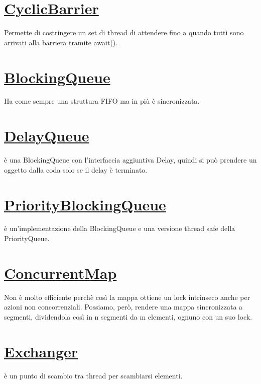 \documentclass[11pt,a4paper]{book}
\begin{document}
\section{\href{https://docs.oracle.com/javase/7/docs/api/java/util/concurrent/CyclicBarrier.html}{CyclicBarrier}}
Permette di costringere un set di thread di attendere fino a quando tutti sono arrivati alla barriera tramite await().
\section{\href{https://docs.oracle.com/javase/7/docs/api/java/util/concurrent/BlockingQueue.html}{BlockingQueue}}
Ha come sempre una struttura FIFO ma in più è sincronizzata.
\section{\href{https://docs.oracle.com/javase/7/docs/api/java/util/concurrent/DelayQueue.html}{DelayQueue}}
è una BlockingQueue con l'interfaccia aggiuntiva Delay, quindi si può prendere un oggetto dalla coda solo se il delay è terminato.
\section{\href{https://docs.oracle.com/javase/7/docs/api/java/util/concurrent/PriorityBlockingQueue.html}{PriorityBlockingQueue}}
è un'implementazione della BlockingQueue e una versione thread safe della PriorityQueue. 
\section{\href{https://docs.oracle.com/javase/8/docs/api/java/util/concurrent/ConcurrentMap.html}{ConcurrentMap}}
Non è molto efficiente perchè così la mappa ottiene un lock intrinseco anche per azioni non concorrenziali. Possiamo, però, rendere una mappa sincronizzata a segmenti, dividendola così in n segmenti da m elementi, ognuno con un suo lock.
\section{\href{https://docs.oracle.com/javase/7/docs/api/java/util/concurrent/Exchanger.html}{Exchanger}}
è un punto di scambio tra thread per scambiarsi elementi.
\end{document}
